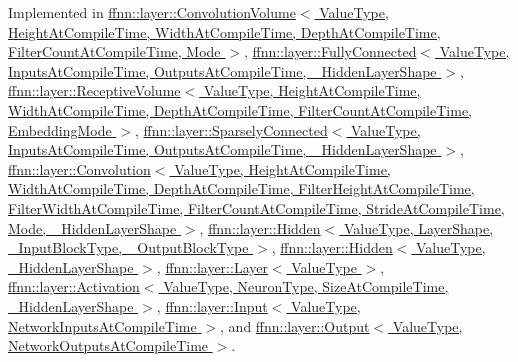 Implemented in \hyperlink{classffnn_1_1layer_1_1_convolution_volume_ae80c8f441de89f0ac4c089a17e43970c}{ffnn\-::layer\-::\-Convolution\-Volume$<$ Value\-Type, Height\-At\-Compile\-Time, Width\-At\-Compile\-Time, Depth\-At\-Compile\-Time, Filter\-Count\-At\-Compile\-Time, Mode $>$}, \hyperlink{classffnn_1_1layer_1_1_fully_connected_a55089e2810d6848950da5ca33000da8a}{ffnn\-::layer\-::\-Fully\-Connected$<$ Value\-Type, Inputs\-At\-Compile\-Time, Outputs\-At\-Compile\-Time, \-\_\-\-Hidden\-Layer\-Shape $>$}, \hyperlink{classffnn_1_1layer_1_1_receptive_volume_a0fc5e18276c0f5d9f052d4a92349ca48}{ffnn\-::layer\-::\-Receptive\-Volume$<$ Value\-Type, Height\-At\-Compile\-Time, Width\-At\-Compile\-Time, Depth\-At\-Compile\-Time, Filter\-Count\-At\-Compile\-Time, Embedding\-Mode $>$}, \hyperlink{classffnn_1_1layer_1_1_sparsely_connected_abb2966b5e7813c43ae2ea5448188a9fb}{ffnn\-::layer\-::\-Sparsely\-Connected$<$ Value\-Type, Inputs\-At\-Compile\-Time, Outputs\-At\-Compile\-Time, \-\_\-\-Hidden\-Layer\-Shape $>$}, \hyperlink{classffnn_1_1layer_1_1_convolution_a2ae5762f45886e132eef09c8550e950a}{ffnn\-::layer\-::\-Convolution$<$ Value\-Type, Height\-At\-Compile\-Time, Width\-At\-Compile\-Time, Depth\-At\-Compile\-Time, Filter\-Height\-At\-Compile\-Time, Filter\-Width\-At\-Compile\-Time, Filter\-Count\-At\-Compile\-Time, Stride\-At\-Compile\-Time, Mode, \-\_\-\-Hidden\-Layer\-Shape $>$}, \hyperlink{classffnn_1_1layer_1_1_hidden_a0bf259cd8d070ce21c90a34d86b173ee}{ffnn\-::layer\-::\-Hidden$<$ Value\-Type, Layer\-Shape, \-\_\-\-Input\-Block\-Type, \-\_\-\-Output\-Block\-Type $>$}, \hyperlink{classffnn_1_1layer_1_1_hidden_a0bf259cd8d070ce21c90a34d86b173ee}{ffnn\-::layer\-::\-Hidden$<$ Value\-Type, \-\_\-\-Hidden\-Layer\-Shape $>$}, \hyperlink{classffnn_1_1layer_1_1_layer_ae8a7daa81382a7965b8ab8861da7e522}{ffnn\-::layer\-::\-Layer$<$ Value\-Type $>$}, \hyperlink{classffnn_1_1layer_1_1_activation_ae73ef2d36d9c5ce3c219f6a51cba3c35}{ffnn\-::layer\-::\-Activation$<$ Value\-Type, Neuron\-Type, Size\-At\-Compile\-Time, \-\_\-\-Hidden\-Layer\-Shape $>$}, \hyperlink{classffnn_1_1layer_1_1_input_ac3de713973a8f67dc348a088ab6dbe1c}{ffnn\-::layer\-::\-Input$<$ Value\-Type, Network\-Inputs\-At\-Compile\-Time $>$}, and \hyperlink{classffnn_1_1layer_1_1_output_ab9ebd05595bc6b75718191aa48e70ad2}{ffnn\-::layer\-::\-Output$<$ Value\-Type, Network\-Outputs\-At\-Compile\-Time $>$}.

